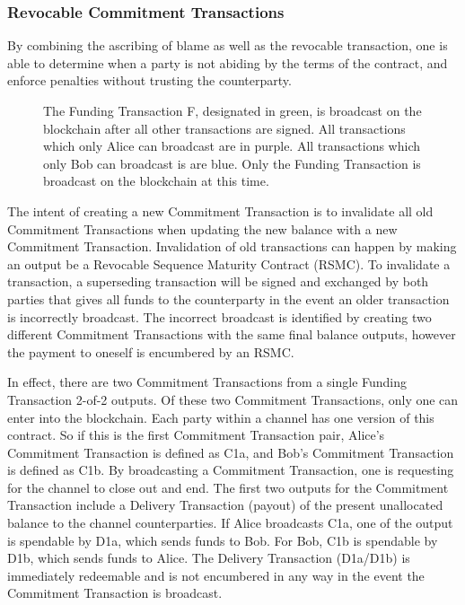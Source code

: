 \documentclass[letterpaper,11pt]{article}
\begin{document}
\subsubsection{Revocable Commitment Transactions}

By combining the ascribing of blame as well as the revocable transaction, one
is able to determine when a party is not abiding by the terms of the contract,
and enforce penalties without trusting the counterparty.

\begin{figure}[H]
	\caption{The Funding Transaction F, designated in green, is broadcast
		on the blockchain after all other transactions are signed. All
		transactions which only Alice can broadcast are in purple. All
		transactions which only Bob can broadcast is are blue. Only the
		Funding Transaction is broadcast on the blockchain at this
		time.
	}
\end{figure}

The intent of creating a new Commitment Transaction is to invalidate all old
Commitment Transactions when updating the new balance with a new Commitment
Transaction. Invalidation of old transactions can happen by making an output be
a Revocable Sequence Maturity Contract (RSMC). To invalidate a transaction, a
superseding transaction will be signed and exchanged by both parties that gives
all funds to the counterparty in the event an older transaction is incorrectly
broadcast. The incorrect broadcast is identified by creating two different
Commitment Transactions with the same final balance outputs, however the payment
to oneself is encumbered by an RSMC.

In effect, there are two Commitment Transactions from a single Funding
Transaction 2-of-2 outputs. Of these two Commitment Transactions, only one can
enter into the blockchain. Each party within a channel has one version of this
contract. So if this is the first Commitment Transaction pair, Alice's
Commitment Transaction is defined as C1a, and Bob's Commitment Transaction is
defined as C1b. By broadcasting a Commitment Transaction, one is requesting for
the channel to close out and end. The first two outputs for the Commitment
Transaction include a Delivery Transaction (payout) of the present unallocated
balance to the channel counterparties. If Alice broadcasts C1a, one of the
output is spendable by D1a, which sends funds to Bob. For Bob, C1b is spendable
by D1b, which sends funds to Alice. The Delivery Transaction (D1a/D1b) is
immediately redeemable and is not encumbered in any way in the event the
Commitment Transaction is broadcast.
\end{document}
